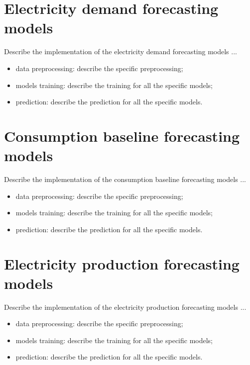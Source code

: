 \section{Electricity demand forecasting models}
\label{sec:demandimpl}
\vspace{0.2 cm}

Describe the implementation of the electricity demand forecasting models ...
\begin{itemize}
  \item data preprocessing: describe the specific preprocessing;
  \item models training: describe the training for all the specific models;
  \item prediction: describe the prediction for all the specific models.
\end{itemize}


\section{Consumption baseline forecasting models}
\label{sec:baselineimpl}
\vspace{0.2 cm}

Describe the implementation of the consumption baseline forecasting models ...
\begin{itemize}
  \item data preprocessing: describe the specific preprocessing;
  \item models training: describe the training for all the specific models;
  \item prediction: describe the prediction for all the specific models.
\end{itemize}


\section{Electricity production forecasting models}
\label{sec:productionimpl}
\vspace{0.2 cm}

Describe the implementation of the electricity production forecasting models ...
\begin{itemize}
  \item data preprocessing: describe the specific preprocessing;
  \item models training: describe the training for all the specific models;
  \item prediction: describe the prediction for all the specific models.
\end{itemize}
